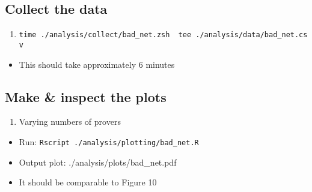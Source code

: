 \hypertarget{collect-the-data-1}{%
\subsection{Collect the data}\label{collect-the-data-1}}

\begin{enumerate}
\def\labelenumi{\arabic{enumi}.}
\tightlist
\item
  \texttt{time\ ./analysis/collect/bad\_net.zsh\ \textbar{}\ tee\ ./analysis/data/bad\_net.csv}
\end{enumerate}

\begin{itemize}
\tightlist
\item
  This should take approximately 6 minutes
\end{itemize}

\hypertarget{make-inspect-the-plots-1}{%
\subsection{Make \& inspect the plots}\label{make-inspect-the-plots-1}}

\begin{enumerate}
\def\labelenumi{\arabic{enumi}.}
\tightlist
\item
  Varying numbers of provers
\end{enumerate}

\begin{itemize}
\tightlist
\item
  Run: \texttt{Rscript\ ./analysis/plotting/bad\_net.R}
\item
  Output plot: ./analysis/plots/bad\_net.pdf
\item
  It should be comparable to Figure 10
\end{itemize}
